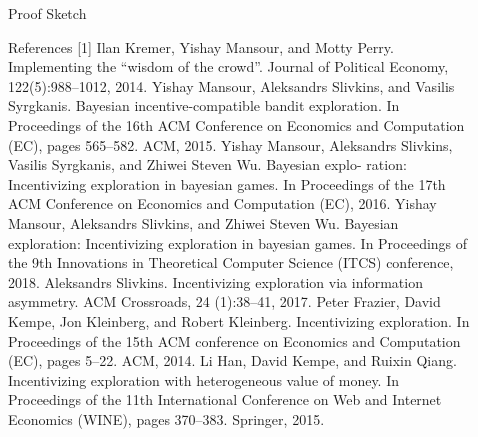 \documentclass[final]{beamer}
\newlength{\sepwid}
\newlength{\onecolwid}
\begin{document}
\begin{frame}[t]
\begin{columns}[t]
\begin{column}{\onecolwid}
\begin{block}{Proof Sketch}
\end{block}
\begin{block}{References}
[1] Ilan Kremer, Yishay Mansour, and Motty Perry. Implementing the “wisdom of the crowd”. Journal of Political Economy, 122(5):988–1012, 2014. \newline
[2] Yishay Mansour, Aleksandrs Slivkins, and Vasilis Syrgkanis. Bayesian incentive-compatible bandit exploration. In Proceedings of the 16th ACM Conference on Economics and Computation (EC), pages 565–582. ACM, 2015. \newline
[3] Yishay Mansour, Aleksandrs Slivkins, Vasilis Syrgkanis, and Zhiwei Steven Wu. Bayesian explo- ration: Incentivizing exploration in bayesian games. In Proceedings of the 17th ACM Conference on Economics and Computation (EC), 2016. \newline
[4] Yishay Mansour, Aleksandrs Slivkins, and Zhiwei Steven Wu. Bayesian exploration: Incentivizing exploration in bayesian games. In Proceedings of the 9th Innovations in Theoretical Computer Science (ITCS) conference, 2018. \newline
[5] Aleksandrs Slivkins. Incentivizing exploration via information asymmetry. ACM Crossroads, 24 (1):38–41, 2017. \newline
[6] Peter Frazier, David Kempe, Jon Kleinberg, and Robert Kleinberg. Incentivizing exploration. In Proceedings of the 15th ACM conference on Economics and Computation (EC), pages 5–22. ACM, 2014. \newline
[7] Li Han, David Kempe, and Ruixin Qiang. Incentivizing exploration with heterogeneous value of money. In Proceedings of the 11th International Conference on Web and Internet Economics (WINE), pages 370–383. Springer, 2015.
\end{block}


\end{column} %


\begin{column}{\sepwid}\end{column} %

\begin{column}{\onecolwid} %


\end{column} %

\end{columns} %

\end{frame} %
\end{document}
